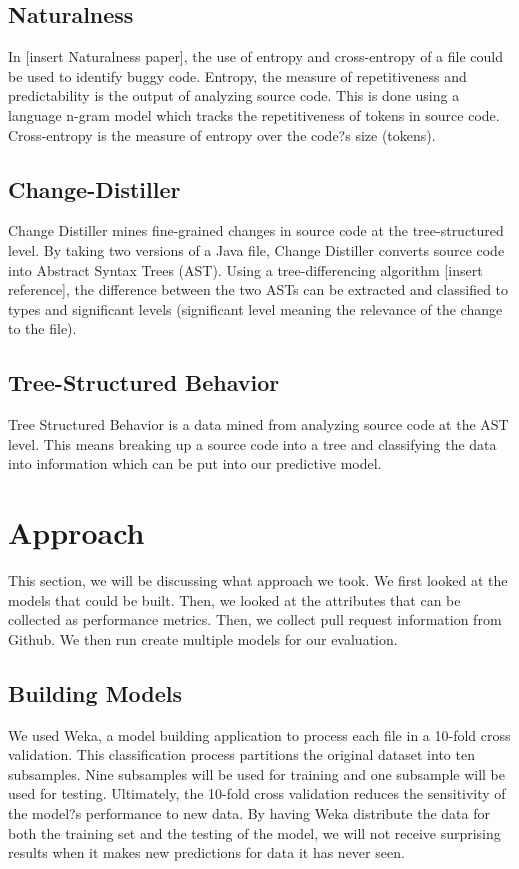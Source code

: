 \documentclass[10pt, conference]{IEEEtran}
\begin{document}

\subsection{Naturalness}
In [insert Naturalness paper], the use of entropy and cross-entropy of a file could be used to identify buggy code. Entropy, the measure of repetitiveness and predictability is the output of analyzing source code. This is done using a language n-gram model which tracks the repetitiveness of tokens in source code.  Cross-entropy is the measure of entropy over the code?s size (tokens).

\subsection{Change-Distiller}
Change Distiller mines fine-grained changes in source code at the tree-structured level. By taking two versions of a Java file, Change Distiller converts source code into Abstract Syntax Trees (AST). Using a tree-differencing algorithm [insert reference], the difference between the two ASTs can be extracted and classified to types and significant levels (significant level meaning the relevance of the change to the file). 

\subsection{Tree-Structured Behavior}
Tree Structured Behavior is a data mined from analyzing source code at the AST level. This means breaking up a source code into a tree and classifying the data into information which can be put into our predictive model.

\section{Approach}
This section, we will be discussing what approach we took. We first looked at the models that could be built. Then, we looked  at the attributes that can be collected as performance metrics. Then, we collect pull request information from Github. We then run create multiple models for our evaluation.

\subsection{Building Models}
We used Weka, a model building application to process each file in a 10-fold cross validation. This classification process partitions the original dataset into ten subsamples. Nine subsamples will be used for training and one subsample will be used for testing. Ultimately, the 10-fold cross validation reduces the sensitivity of the model?s performance to new data. By having Weka distribute the data for both the training set and the testing of the model, we will not receive surprising results when it makes new predictions for data it has never seen.
\end{document}
